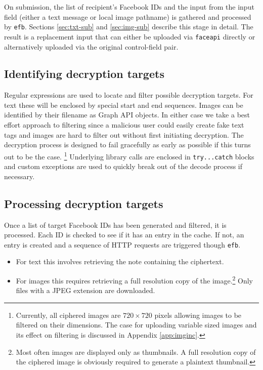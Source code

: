 On submission, the list of recipient's Facebook IDs and the input from the input field (either a text message or local image pathname) is gathered and processed by {\tt efb}. Sections \ref{sec:txt-sub} and \ref{sec:img-sub} describe this stage in detail. The result is a replacement input that can either be uploaded via {\tt faceapi} directly or alternatively uploaded via the original control-field pair.

\subsection{Identifying decryption targets}
\label{ssec:ident-targets}

Regular expressions are used to locate and filter possible decryption targets. For text these will be enclosed by special start and end sequences. Images can be identified by their filename as Graph API objects. In either case we take a best effort approach to filtering since a malicious user could easily create fake text tags and images are hard to filter out without first initiating decryption. The decryption process is designed to fail gracefully as early as possible if this turns out to be the case. \footnote{Currently, all ciphered images are $720 \times 720$ pixels allowing images to be filtered on their dimensions. The case for uploading variable sized images and its effect on filtering is discussed in Appendix \ref{app:imginc}.} Underlying library calls are enclosed in {\tt try...catch} blocks and custom exceptions are used to quickly break out of the decode process if necessary.

    
\subsection{Processing decryption targets}
\label{ssec:proc-targets}


Once a list of target Facebook IDs has been generated and filtered, it is processed. Each ID is checked to see if it has an entry in the cache. If not, an entry is created and a sequence of HTTP requests are triggered though {\tt efb}.

\begin{itemize}
\item For text this involves retrieving the note containing the ciphertext.

\item For images this requires retrieving a full resolution copy of the image.\footnote{Most often images are displayed only as thumbnails. A full resolution copy of the ciphered image is obviously required to generate a plaintext thumbnail.} Only files with a JPEG extension are downloaded.
\end{itemize}

